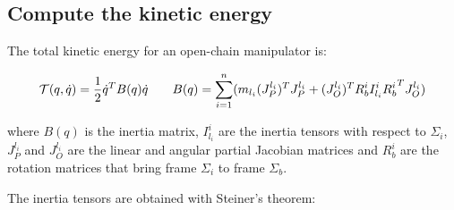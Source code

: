 \subsection{Compute the kinetic energy}

The total kinetic energy for an open-chain manipulator is:

\begin{equation*}
\mathcal{T}(q,\dot q)=\frac{1}{2}\dot q^TB(q)\dot q\;\;\;\;\;\;\;B(q)=\sum\limits_{i=1}^n(m_{l_i}(J_P^{l_i})^TJ_P^{l_i}+(J_O^{l_i})^TR_b^iI_{l_i}^i{R_b^i}^TJ_O^{l_i})
\end{equation*}

where $B(q)$ is the inertia matrix, $I_{l_i}^i$ are the inertia tensors with respect to $\Sigma_i$, $J_P^{l_i}$ and $J_O^{l_i}$ are the linear and angular partial Jacobian matrices and $R_b^i$ are the rotation matrices that bring frame $\Sigma_i$ to frame $\Sigma_b$.

The inertia tensors are obtained with Steiner's theorem:

